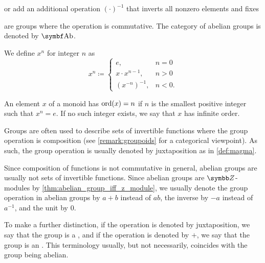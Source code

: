 \begin{definition}
\begin{itemize}
    or add an additional operation \( (\cdot)^{-1} \) that inverts all nonzero elements and fixes

      are groups where the operation is commutative. The category of abelian groups is denoted by \( \Cat{Ab} \).
  \end{itemize}

  We define \( x^n \) for integer \( n \) as
  \begin{equation*}
    x^n \coloneqq \begin{cases}
      e, &n = 0 \\
      x \cdot x^{n-1}, &n > 0 \\
      (x^{-n})^{-1}, &n < 0.
    \end{cases}
  \end{equation*}

  An element \( x \) of a monoid has  \( \operatorname{ord}(x) = n \) if \( n \) is the smallest positive integer such that \( x^n = e \). If no such integer exists, we say that \( x \) has infinite order.
\end{definition}

\begin{remark}\label{remark:additive_group}
  Groups are often used to describe sets of invertible functions where the group operation is composition (see \cref{remark:groupoids} for a categorical viewpoint). As such, the group operation is usually denoted by juxtaposition as in \cref{def:magma}.

  Since composition of functions is not commutative in general, abelian groups are usually not sets of invertible functions. Since abelian groups are \( \Z \)-modules by \cref{thm:abelian_group_iff_z_module}, we usually denote the group operation in abelian groups by \( a + b \) instead of \( ab \), the inverse by \( -a \) instead of \( a^{-1} \), and the unit by \( 0 \).

  To make a further distinction, if the operation is denoted by juxtaposition, we say that the group is a , and if the operation is denoted by \( + \), we say that the group is an . This terminology usually, but not necessarily, coincides with the group being abelian.
\end{remark}

